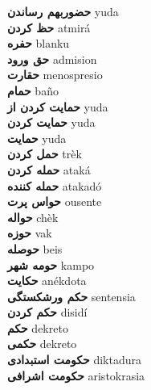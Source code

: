 \textbf{ حضوربهم رساندن  } yuda \\
\textbf{ حظ کردن  } atmirá \\
\textbf{ حفره  } blanku \\
\textbf{ حق ورود  } admision \\
\textbf{ حقارت  } menospresio \\
\textbf{ حمام  } baño \\
\textbf{ حمایت کردن از  } yuda \\
\textbf{ حمایت کردن  } yuda \\
\textbf{ حمایت  } yuda \\
\textbf{ حمل کردن  } trèk \\
\textbf{ حمله کردن  } ataká \\
\textbf{ حمله کننده  } atakadó \\
\textbf{ حواس پرت  } ousente \\
\textbf{ حواله  } chèk \\
\textbf{ حوزه  } vak \\
\textbf{ حوصله  } beis \\
\textbf{ حومه شهر  } kampo \\
\textbf{ حکایت  } anékdota \\
\textbf{ حکم ورشکستگی  } sentensia \\
\textbf{ حکم کردن  } disidí \\
\textbf{ حکم  } dekreto \\
\textbf{ حکمی  } dekreto \\
\textbf{ حکومت استبدادی  } diktadura \\
\textbf{ حکومت اشرافی  } aristokrasia \\
